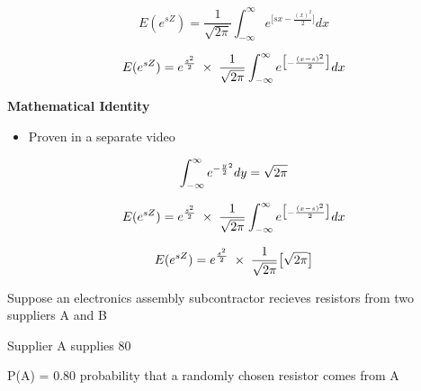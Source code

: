 \documentclass[12pt]{report}
\begin{document}
	
	
	
	\Large
	
	
	
	{
		\LARGE
		\[ E( e^{sZ} ) =  \frac{1}{\sqrt{2\pi}} \int_{-\infty}^{\infty}   e^{ \big[sx-\frac{(x)^2}{2} \big]} dx   \]
	}
	
	
	
	\Large
	
	
	
	{
		\LARGE
		\[ E( e^{sZ} ) =  e^{{s^2\over 2}} \; \times\; \frac{1}{\sqrt{2\pi}} \int_{-\infty}^{\infty} e^{ \big[-\frac{(x-s)^2}{2} \big]} dx   \]
	}
	
	
	
	\Large
	\textbf{Mathematical Identity}
	\begin{itemize}
		\item Proven in a separate video
	\end{itemize}
	{
		\LARGE
		\[\int_{-\infty}^{\infty} e^{-{y\over 2}^2}dy  = \sqrt{2\pi}\]
		
	}
	
	
	
	\Large
	
	
	
	{
		\LARGE
		\[ E( e^{sZ} ) =  e^{{s^2\over 2}} \; \times\; \frac{1}{\sqrt{2\pi}} \int_{-\infty}^{\infty} e^{ \big[-\frac{(x-s)^2}{2} \big]} dx \]
		
		
		\[ E( e^{sZ} ) =  e^{{s^2\over 2}} \; \times\; \frac{1}{\sqrt{2\pi}} \big[\sqrt{2\pi} \big] \]
	}
	
	
	
	
	Suppose an electronics assembly subcontractor recieves resistors from two suppliers A and B
	
	Supplier A supplies 80%
	
	P(A) = 0.80 probability that a randomly chosen resistor comes from A
	
\end{document}

